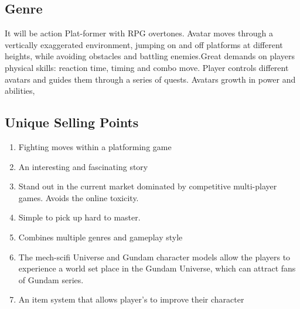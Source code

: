 \documentclass{article}
\begin{document}
\subsection*{Genre}
It will be action Plat-former with RPG overtones. Avatar moves through a vertically exaggerated environment, jumping on and off platforms at different heights, while avoiding obstacles and battling enemies.Great demands on players physical skills: reaction time, timing and combo move.
Player controls different avatars and guides them through a series of quests. Avatars growth in power and abilities,

\subsection*{Unique Selling Points}
    \begin{enumerate}
        \item Fighting moves within a platforming game
        \item An interesting and fascinating story 
        \item Stand out in the current market dominated by competitive multi-player games. Avoids the online toxicity.
        \item Simple to pick up hard to master.
        \item Combines multiple genres and gameplay style
        \item The mech-scifi Universe and Gundam character models allow the players to experience a world set place in the Gundam Universe, which can attract fans of Gundam series.
        \item An item system that allows player's to improve their character 
    \end{enumerate}
\end{document}
